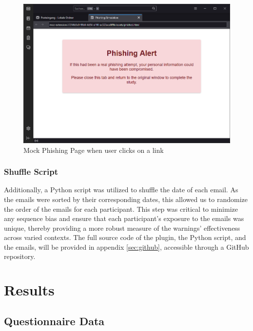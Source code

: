 \documentclass[
  a4paper,  %
  twoside,  %
  bibliography=totoc,
  headsepline,
  cleardoublepage=empty,
  parskip=half,
  draft=false
]{scrbook}
\begin{document}
\begin{figure} [ht]
    \centering
    \includegraphics[width=1\linewidth]{figures/mockpage.png}
    \caption{Mock Phishing Page when user clicks on a link}
    \label{fig:mock}
\end{figure}


\subsection{Shuffle Script}
Additionally, a Python script was utilized to shuffle the date of each email. As the emails were sorted by their corresponding dates, this allowed us to randomize the order of the emails for each participant. This step was critical to minimize any sequence bias and ensure that each participant's exposure to the emails was unique, thereby providing a more robust measure of the warnings' effectiveness across varied contexts. The full source code of the plugin, the Python script, and the emails, will be provided in appendix \ref{sec:github}, accessible through a GitHub repository.

\chapter{Results}
\label{results}

\section{Questionnaire Data}
\end{document}
